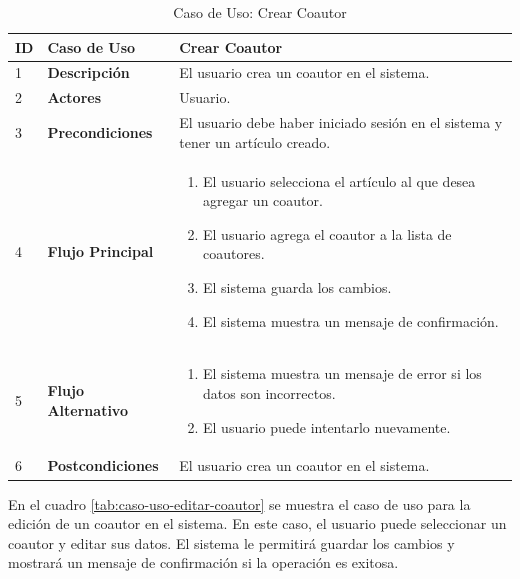 \begin{table}[H]
    \centering
        \begin{tabular}{|p{0.5cm}|p{3.5cm}|p{10cm}|}
        \hline
        \textbf{ID} & \textbf{Caso de Uso} & \textbf{Crear Coautor} \\
        \hline
        1 & \textbf{Descripción} & El usuario crea un coautor en el sistema. \\
        \hline
        2 & \textbf{Actores} & Usuario. \\
        \hline
        3 & \textbf{Precondiciones} & El usuario debe haber iniciado sesión en el sistema y tener un artículo creado. \\
        \hline
        4 & \textbf{Flujo Principal} & 
        \begin{enumerate}
            \item El usuario selecciona el artículo al que desea agregar un coautor.
            \item El usuario agrega el coautor a la lista de coautores.
            \item El sistema guarda los cambios.
            \item El sistema muestra un mensaje de confirmación.
        \end{enumerate} \\
        \hline
        5 & \textbf{Flujo Alternativo} & 
        \begin{enumerate}
            \item El sistema muestra un mensaje de error si los datos son incorrectos.
            \item El usuario puede intentarlo nuevamente.
        \end{enumerate} \\
        \hline
        6 & \textbf{Postcondiciones} & El usuario crea un coautor en el sistema. \\
        \hline
    \end{tabular}
    \caption{Caso de Uso: Crear Coautor}
    \label{tab:caso-uso-crear-coautor}

\end{table}

En el cuadro \ref{tab:caso-uso-editar-coautor} se muestra el caso de uso para la edición de un coautor en el sistema. En este caso, el usuario puede seleccionar un coautor y editar sus datos. El sistema le permitirá guardar los cambios y mostrará un mensaje de confirmación si la operación es exitosa.

